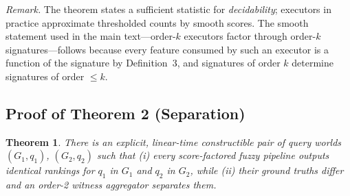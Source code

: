 \documentclass[journal]{IEEEtran}
\newtheorem{theorem*}{Theorem}
\begin{document}
\emph{Remark.} The theorem states a sufficient statistic for
\emph{decidability}; executors in practice approximate thresholded counts
by smooth scores. The smooth statement used in the main text---order-$k$
executors factor through order-$k$ signatures---follows because every
feature consumed by such an executor is a function of the signature by
Definition~3, and signatures of order $k$ determine signatures of order
$\le k$.

\subsection*{Proof of Theorem 2 (Separation)}

\begin{theorem*}
There is an explicit, linear-time constructible pair of query worlds
$(G_1,q_1)$, $(G_2,q_2)$ such that (i) every score-factored fuzzy pipeline
outputs identical rankings for $q_1$ in $G_1$ and $q_2$ in $G_2$, while
(ii) their ground truths differ and an order-2 witness aggregator
separates them.
\end{theorem*}
\end{document}
